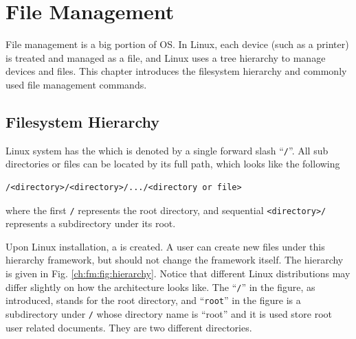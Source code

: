 \chapter{File Management} \label{ch:fm}

File management is a big portion of OS. In Linux, each device (such as a printer) is treated and managed as a file, and Linux uses a tree hierarchy to manage devices and files. This chapter introduces the filesystem hierarchy and commonly used file management commands.

\section{Filesystem Hierarchy} \label{ch:fm:sec:hierarchy}

Linux system has the  which is denoted by a single forward slash ``\verb|/|''. All sub directories or files can be located by its full path, which looks like the following
\begin{lstlisting}
/<directory>/<directory>/.../<directory or file>
\end{lstlisting}
where the first \verb|/| represents the root directory, and sequential \verb|<directory>/| represents a subdirectory under its root.

Upon Linux installation, a  is created. A user can create new files under this hierarchy framework, but should not change the framework itself. The hierarchy is given in Fig. \ref{ch:fm:fig:hierarchy}. Notice that different Linux distributions may differ slightly on how the architecture looks like. The ``\verb|/|'' in the figure, as introduced, stands for the root directory, and ``\verb|root|'' in the figure is a subdirectory under \verb|/| whose directory name is ``root'' and it is used store root user related documents. They are two different directories.

